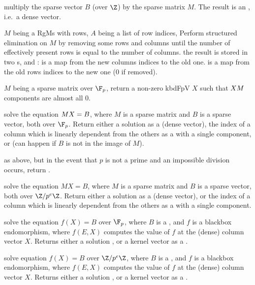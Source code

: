 multiply the sparse vector $B$ (over
$\Z$) by the sparse matrix $M$. The result is an , i.e.~a
dense vector.

$M$ being a RgMs with  rows, $A$ being a list of row indices,
Perform structured elimination on $M$ by removing some rows and columns until
the number of effectively present rows is equal to the number of columns.
the result is stored in two s,  and :
 is a map from the new columns indices to the old one.
 is a map from the old rows indices to the new one ($0$ if removed).

$M$ being a sparse matrix over $\F_p$, return a non-zero kbd{FpV} $X$ such
that $X\*M$ components are almost all $0$.

solve the equation $M\*X = B$, where $M$ is a sparse matrix and $B$ is a sparse
vector, both over $\F_p$. Return either a solution as a  (dense
vector), the index of a column which is linearly dependent from the
others as a  with a single component, or 
(can happen if $B$ is not in the image of $M$).

as above, but in the event that $p$ is not a prime and an impossible division
occurs, return .

solve the equation $MX = B$, where $M$ is a sparse matrix and $B$ is a sparse
vector, both over $\Z/p^e\Z$. Return either a solution as a  (dense
vector), or the index of a column which is linearly dependent from the
others as a  with a single component.

solve the equation $f(X) = B$ over $\F_p$, where $B$ is a , and $f$
is a blackbox endomorphism, where $f(E, X)$ computes the value of $f$ at the
(dense) column vector $X$. Returns either a solution , or a kernel
vector as a .

solve equation $f(X) = B$ over $\Z/p^e\Z$, where $B$ is a , and $f$ is a
blackbox endomorphism, where $f(E, X)$ computes the value of $f$ at the
(dense) column vector $X$. Returns either a solution , or a kernel
vector as a .

